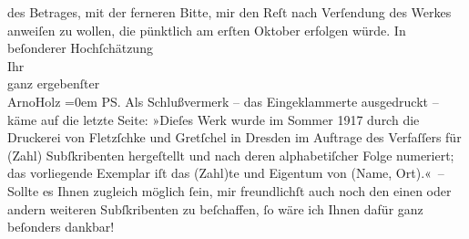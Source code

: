 \begin{ledgroupsized}[t]{13cm}
               des Betrages, mit der ferneren Bitte, mir den Reſt nach Verſendung des Werkes
               anweiſen zu wollen, die pünktlich am erſten Oktober erfolgen würde.\pend
           \pstart
           In beſonderer Hochſchätzung{\\[\baselineskip]}Ihr{\\[\baselineskip]}ganz ergebenſter{\\[\baselineskip]}\spacefill\mbox{ArnoHolz}\pend
           \leftskip=0em{}\pstart
           PS. Als Schlußvermerk – das Eingeklammerte ausgedruckt – käme auf die letzte
               Seite:\pend
           \pstart
           »Dieſes Werk wurde im Sommer 1917 durch die Druckerei von Fletzſchke und Gretſchel in Dresden im Auftrage des Verfaſſers für (Zahl) Subſkribenten
               hergeſtellt und nach deren alphabetiſcher Folge numeriert; das vorliegende Exemplar
               iſt das (Zahl)te und Eigentum von (Name, Ort).« –\pend
           \pstart
           Sollte es Ihnen zugleich möglich ſein, mir freundlichſt auch noch den einen oder
               andern weiteren Subſkribenten zu beſchaffen, ſo wäre ich Ihnen dafür ganz beſonders
               dankbar!\pend
           
         
         \endnumbering{}\end{ledgroupsized}  \newcommand{\dateiname}{L02255}\newcommand{\titel}{Arno Holz an Arthur Schnitzler, 11. 2. 1917}\newcommand{\editorInnen}{Martin Anton Müller und Gerd-Hermann Susen}
      
